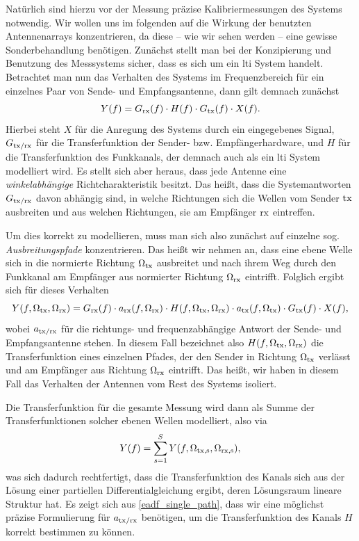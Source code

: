 Nat\"urlich sind hierzu vor der Messung pr\"azise Kalibriermessungen des Systems notwendig. Wir wollen uns im folgenden auf die Wirkung der benutzten Antennenarrays konzentrieren, da diese -- wie wir sehen werden -- eine gewisse Sonderbehandlung ben\"otigen. Zun\"achst stellt man bei der Konzipierung und Benutzung des Messsystems sicher, dass es sich um ein \gls{lti} System handelt. Betrachtet man nun das Verhalten des Systems im Frequenzbereich f\"ur ein einzelnes Paar von Sende- und Empfangsantenne, dann gilt demnach zun\"achst
\begin{equation}
    Y(f) = G_{\rm rx}(f) \cdot H(f) \cdot G_{\rm tx}(f) \cdot X(f).
\end{equation}
Hierbei steht $X$ f\"ur die Anregung des Systems durch ein eingegebenes Signal, $G_{\rm tx/\rm rx}$ f\"ur die Transferfunktion der Sender- bzw. Empf\"angerhardware, und $H$ f\"ur die Transferfunktion des Funkkanals, der demnach auch als ein \gls{lti} System modelliert wird. Es stellt sich aber heraus, dass jede Antenne eine \emph{winkelabh\"angige} Richtcharakteristik besitzt. Das hei{\ss}t, dass die Systemantworten $G_{\rm tx/\rm rx}$ davon abh\"angig sind, in welche Richtungen sich die Wellen vom Sender $\rm tx$ ausbreiten und aus welchen Richtungen, sie am Empf\"anger $\rm rx$ eintreffen. 

Um dies korrekt zu modellieren, muss man sich also zun\"achst auf einzelne sog. \emph{Ausbreitungspfade} konzentrieren. Das hei{\ss}t wir nehmen an, dass eine ebene Welle sich in die normierte Richtung $\Omega_{\rm tx}$ ausbreitet und nach ihrem Weg durch den Funkkanal am Empf\"anger aus normierter Richtung $\Omega_{\rm rx}$ eintrifft. Folglich ergibt sich f\"ur dieses Verhalten
\begin{equation}\label{eadf_single_path}
    Y(f, \Omega_{\rm tx}, \Omega_{\rm rx}) = 
        G_{\rm rx}(f) \cdot a_{\rm rx}(f, \Omega_{\rm rx})
        \cdot H(f, \Omega_{\rm tx}, \Omega_{\rm rx}) 
        \cdot a_{\rm tx}(f, \Omega_{\rm tx}) \cdot G_{\rm tx}(f)
        \cdot X(f),
\end{equation}
%
wobei $a_{\rm tx/\rm rx}$ f\"ur die richtungs- und frequenzabh\"angige Antwort der Sende- und Empfangsantenne stehen. In diesem Fall bezeichnet also $H(f, \Omega_{\rm tx}, \Omega_{\rm rx})$ die Transferfunktion eines einzelnen Pfades, der den Sender in Richtung $\Omega_{\rm tx}$ verl\"asst und am Empf\"anger aus Richtung $\Omega_{\rm rx}$ eintrifft. Das hei{\ss}t, wir haben in diesem Fall das Verhalten der Antennen vom Rest des Systems isoliert. 

Die Transferfunktion f\"ur die gesamte Messung wird dann als Summe der Transferfunktionen solcher ebenen Wellen modelliert, also via
\begin{equation}
    Y(f) = {\sum\limits_{s = 1}^{S}{
        Y(f, \Omega_{\rm tx,s}, \Omega_{\rm rx,s})
    }},
\end{equation}
was sich dadurch rechtfertigt, dass die Transferfunktion des Kanals sich aus der L\"osung einer partiellen Differentialgleichung ergibt, deren L\"osungsraum lineare Struktur hat.
Es zeigt sich aus \eqref{eadf_single_path}, dass wir eine m\"oglichst pr\"azise Formulierung f\"ur $a_{\rm tx/\rm rx}$ ben\"otigen, um die Transferfunktion des Kanals $H$ korrekt bestimmen zu k\"onnen.
%
%
%
